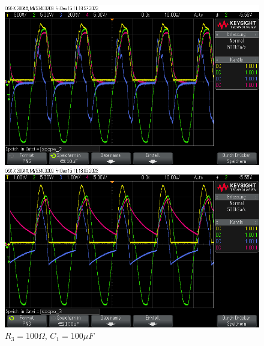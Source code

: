 \documentclass[12pt,a4paper,twoside]{article}
\begin{document}
\begin{figure}[H]
    \begin{minipage}[b]{.5\linewidth} %
        \includegraphics[width=1\linewidth]{nudes/Halbleiterdiode/Aufgabe3/100Ohm/10uF/scope_2.png}
        \caption{$R_3 = 100 \Omega$, $C_1 = 10 \mu F$}
    \end{minipage}
    \hspace{0.01\linewidth}%
    \begin{minipage}[b]{.5\linewidth} %
        \includegraphics[width=1\linewidth]{nudes/Halbleiterdiode/Aufgabe3/100Ohm/100uF/scope_3.png}
    \caption{$R_3 = 100 \Omega$, $C_1 = 100 \mu F$}
    \end{minipage}
\end{figure}
\end{document}

